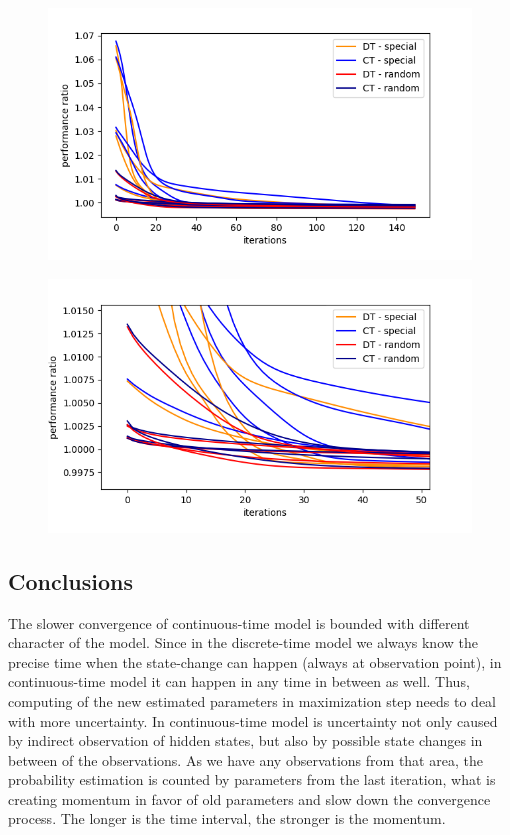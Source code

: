\documentclass[thesis=M,english]{FITthesis}[2012/10/20]
\begin{document}
\begin{figure}
\centering
\begin{minipage}{1\textwidth}
  \centering
  \includegraphics[width=1\linewidth]{img/ex1/g3.png}
  \label{fig:all}
\end{minipage}
\begin{minipage}{1\textwidth}
  \centering
  \includegraphics[width=1\linewidth]{img/ex1/g4.png}
  \label{fig:random}
\end{minipage}
\end{figure}  

\subsection*{ Conclusions }

The slower convergence of continuous-time model is bounded with different character of the model. Since in the discrete-time model we always know the precise time when the state-change can happen (always at observation point), in continuous-time model it can happen in any time in between as well. Thus, computing of the new estimated parameters in maximization step needs to deal with more uncertainty. 
In continuous-time model is uncertainty not only caused by indirect observation of hidden states, but also by possible state changes in between of the observations. As we have any observations from that area, the probability estimation is counted by parameters from the last iteration, what is creating momentum in favor of old parameters and slow down the convergence process. The longer is the time interval, the stronger is the momentum.
\end{document}
